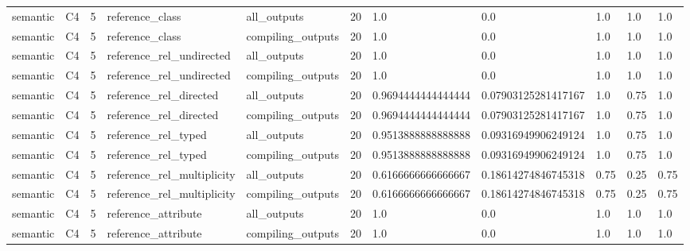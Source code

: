 \begin{tabular}{lllllllllll}
semantic & C4 & 5 & reference\_class & all\_outputs & 20 & 1.0 & 0.0 & 1.0 & 1.0 & 1.0 \\
semantic & C4 & 5 & reference\_class & compiling\_outputs & 20 & 1.0 & 0.0 & 1.0 & 1.0 & 1.0 \\
semantic & C4 & 5 & reference\_rel\_undirected & all\_outputs & 20 & 1.0 & 0.0 & 1.0 & 1.0 & 1.0 \\
semantic & C4 & 5 & reference\_rel\_undirected & compiling\_outputs & 20 & 1.0 & 0.0 & 1.0 & 1.0 & 1.0 \\
semantic & C4 & 5 & reference\_rel\_directed & all\_outputs & 20 & 0.9694444444444444 & 0.07903125281417167 & 1.0 & 0.75 & 1.0 \\
semantic & C4 & 5 & reference\_rel\_directed & compiling\_outputs & 20 & 0.9694444444444444 & 0.07903125281417167 & 1.0 & 0.75 & 1.0 \\
semantic & C4 & 5 & reference\_rel\_typed & all\_outputs & 20 & 0.9513888888888888 & 0.09316949906249124 & 1.0 & 0.75 & 1.0 \\
semantic & C4 & 5 & reference\_rel\_typed & compiling\_outputs & 20 & 0.9513888888888888 & 0.09316949906249124 & 1.0 & 0.75 & 1.0 \\
semantic & C4 & 5 & reference\_rel\_multiplicity & all\_outputs & 20 & 0.6166666666666667 & 0.18614274846745318 & 0.75 & 0.25 & 0.75 \\
semantic & C4 & 5 & reference\_rel\_multiplicity & compiling\_outputs & 20 & 0.6166666666666667 & 0.18614274846745318 & 0.75 & 0.25 & 0.75 \\
semantic & C4 & 5 & reference\_attribute & all\_outputs & 20 & 1.0 & 0.0 & 1.0 & 1.0 & 1.0 \\
semantic & C4 & 5 & reference\_attribute & compiling\_outputs & 20 & 1.0 & 0.0 & 1.0 & 1.0 & 1.0 \\
\end{tabular}
